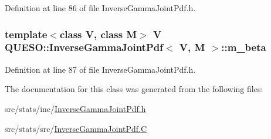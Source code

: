 Definition at line 86 of file Inverse\-Gamma\-Joint\-Pdf.\-h.

\hypertarget{class_q_u_e_s_o_1_1_inverse_gamma_joint_pdf_a599b413c540f5b8bae0482ff626e3562}{
\subsubsection[{m\-\_\-beta}]{\setlength{\rightskip}{0pt plus 5cm}template$<$class V, class M$>$ V {\bf Q\-U\-E\-S\-O\-::\-Inverse\-Gamma\-Joint\-Pdf}$<$ V, M $>$\-::m\-\_\-beta\hspace{0.3cm}{\ttfamily [protected]}}}\label{class_q_u_e_s_o_1_1_inverse_gamma_joint_pdf_a599b413c540f5b8bae0482ff626e3562}


Definition at line 87 of file Inverse\-Gamma\-Joint\-Pdf.\-h.



The documentation for this class was generated from the following files\-:\begin{DoxyCompactItemize}
\item 
src/stats/inc/\hyperlink{_inverse_gamma_joint_pdf_8h}{Inverse\-Gamma\-Joint\-Pdf.\-h}\item 
src/stats/src/\hyperlink{_inverse_gamma_joint_pdf_8_c}{Inverse\-Gamma\-Joint\-Pdf.\-C}\end{DoxyCompactItemize}
